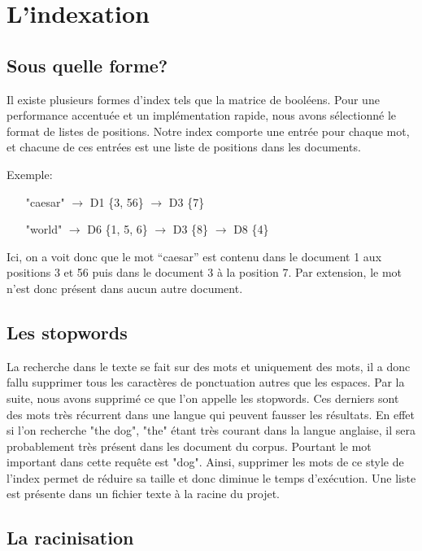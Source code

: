 \documentclass[a4paper,10pt]{report}
\begin{document}
\section{L'indexation}

\subsection{Sous quelle forme?}

Il existe plusieurs formes d'index tels que la matrice de bool\'eens. Pour une performance accentu\'ee et un impl\'ementation rapide, nous avons s\'electionn\'e le format de listes de positions. Notre index comporte une entr\'ee pour chaque mot, et chacune de ces entr\'ees est une liste de positions dans les documents.

Exemple:

\begin{itemize}
 \item ["caesar"] $\rightarrow$ D1 \{3, 56\} $\rightarrow$ D3 \{7\}
 \item ["world"] $\rightarrow$ D6 \{1, 5, 6\} $\rightarrow$ D3 \{8\} $\rightarrow$ D8 \{4\}
\end{itemize}
Ici, on a voit donc que le mot ``caesar'' est contenu dans le document 1 aux positions 3 et 56 puis dans le document 3 à la position 7. Par extension, le mot n'est donc présent dans aucun autre document.

\subsection{Les stopwords}

La recherche dans le texte se fait sur des mots et uniquement des mots, il a donc fallu supprimer tous les caract\`eres de ponctuation autres que les espaces. Par la suite, nous avons supprim\'e ce que l'on appelle les stopwords. Ces derniers sont des mots tr\`es r\'ecurrent dans une langue qui peuvent fausser les r\'esultats. En effet si l'on recherche "the dog", "the" \'etant tr\`es courant dans la langue anglaise, il sera probablement tr\`es pr\'esent dans les document du corpus. Pourtant le mot important dans cette requ\^ete est "dog". Ainsi, supprimer les mots de ce style de l'index permet de r\'eduire sa taille et donc diminue le temps d'ex\'ecution. Une liste est pr\'esente dans un fichier texte \`a la racine du projet.

\subsection{La racinisation}
\end{document}
